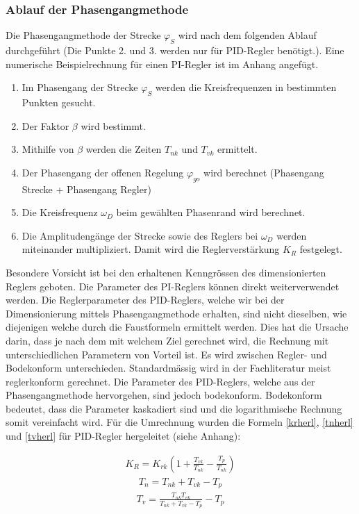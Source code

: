 \subsubsection{Ablauf der Phasengangmethode}
Die Phasengangmethode der Strecke $\varphi_S$ wird nach dem folgenden Ablauf durchgeführt (Die Punkte 2. und 3. werden nur für PID-Regler benötigt.). Eine numerische Beispielrechnung für einen PI-Regler ist im Anhang angefügt.
\begin{enumerate}
\item Im Phasengang der Strecke $\varphi_S$ werden die Kreisfrequenzen in bestimmten Punkten gesucht.
\item Der Faktor $\beta$ wird bestimmt.
\item Mithilfe von $\beta$ werden die Zeiten $T_{nk}$ und $T_{vk}$ ermittelt.
\item Der Phasengang der offenen Regelung $\varphi_{go}$ wird berechnet (Phasengang Strecke + Phasengang Regler)
\item Die Kreisfrequenz $\omega_D$ beim gewählten Phasenrand wird berechnet.
\item Die Amplitudengänge der Strecke sowie des Reglers bei $\omega_D$ werden miteinander multipliziert. Damit wird die Reglerverstärkung $K_R$ festgelegt. 
\end{enumerate}

Besondere Vorsicht ist bei den erhaltenen Kenngrössen des dimensionierten Reglers geboten. Die Parameter des PI-Reglers können direkt weiterverwendet werden. Die Reglerparameter des PID-Reglers, welche wir bei der Dimensionierung mittels Phasengangmethode erhalten, sind nicht dieselben, wie diejenigen welche durch die Faustformeln ermittelt werden. Dies hat die Ursache darin, dass je nach dem mit welchem Ziel gerechnet wird, die Rechnung mit unterschiedlichen Parametern von Vorteil ist. Es wird zwischen Regler- und Bodekonform unterschieden. Standardmässig wird in der Fachliteratur meist reglerkonform gerechnet. Die Parameter des PID-Reglers, welche aus der Phasengangmethode hervorgehen, sind jedoch bodekonform. Bodekonform bedeutet, dass die Parameter kaskadiert sind und die logarithmische Rechnung somit vereinfacht wird. Für die Umrechnung wurden die Formeln \ref{krherl}, \ref{tnherl} und \ref{tvherl} für PID-Regler hergeleitet (siehe Anhang): \newline

\begin{align}
K_R=K_{rk}\left(1+\frac{T_{vk}}{T_{nk}}-\frac{T_p}{T_{nk}}\right)
\label{krherl}
\end{align}
\begin{align}
T_n=T_{nk}+T_{vk}-T_p
\label{tnherl}
\end{align}
\begin{align}
T_v=\frac{T_{nk}T_{vk}}{T_{nk}+T_{vk}-T_p}-T_p
\label{tvherl}
\end{align}\newline

